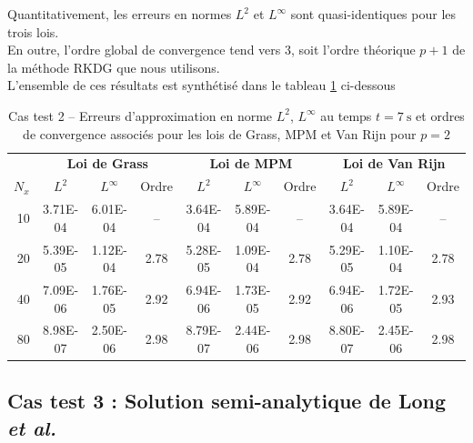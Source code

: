 \documentclass[11pt, a4paper, oneside]{report}
\begin{document}
Quantitativement, les erreurs en normes $L^2$ et $L^\infty$ sont quasi-identiques pour les trois lois. \\
En outre, l'ordre global de convergence tend vers 3, soit l'ordre théorique $p+1$ de la méthode RKDG que nous utilisons. \\
L'ensemble de ces résultats est synthétisé dans le tableau \ref{tab:convergence_berthon} ci-dessous
\begin{table}[h!]
    \centering
    \small %
    \begin{tabular}{r ccc ccc ccc}
    \toprule
    & \multicolumn{3}{c}{\textbf{Loi de Grass}} & \multicolumn{3}{c}{\textbf{Loi de MPM}} & \multicolumn{3}{c}{\textbf{Loi de Van Rijn}} \\
    \cmidrule(lr){2-4} \cmidrule(lr){5-7} \cmidrule(lr){8-10}
    $N_x$ & $L^2$ & $L^\infty$ & Ordre & $L^2$ & $L^\infty$ & Ordre & $L^2$ & $L^\infty$ & Ordre \\
    \midrule
    10 & 3.71E-04 & 6.01E-04 & -- & 3.64E-04 & 5.89E-04 & -- & 3.64E-04 & 5.89E-04 & -- \\
    20 & 5.39E-05 & 1.12E-04 & 2.78 & 5.28E-05 & 1.09E-04 & 2.78 & 5.29E-05 & 1.10E-04 & 2.78 \\
    40 & 7.09E-06 & 1.76E-05 & 2.92 & 6.94E-06 & 1.73E-05 & 2.92 & 6.94E-06 & 1.72E-05 & 2.93 \\
    80 & 8.98E-07 & 2.50E-06 & 2.98 & 8.79E-07 & 2.44E-06 & 2.98 & 8.80E-07 & 2.45E-06 & 2.98 \\
    \bottomrule
    \end{tabular}
    \caption{Cas test 2 -- Erreurs d'approximation en norme $L^2$, $L^\infty$ au temps $t = \SI{7}{\second}$ et ordres de convergence associés pour les lois de Grass, MPM et Van Rijn pour $p = 2$}
    \label{tab:convergence_berthon}
\end{table}

\subsection{Cas test 3 : Solution semi-analytique de Long \textit{et al.}}
\end{document}
